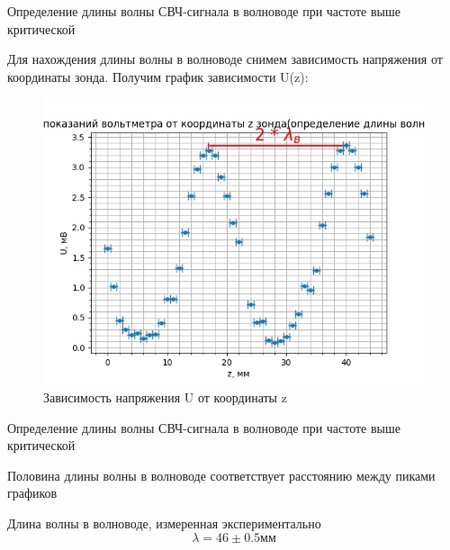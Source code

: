 \documentclass[12pt]{beamer}
\begin{document}
\begin{frame}{Определение длины волны СВЧ-сигнала в волноводе при частоте выше критической}
    \begin{block}{}
        \centering
        Для нахождения длины волны в волноводе снимем зависимость напряжения от координаты зонда. Получим график зависимости U(z):
    \end{block}
    
    \begin{figure}
        \centering
        \includegraphics[scale=0.3]{graf11.jpg}
        \caption{Зависимость напряжения U от координаты z}
        \label{fig:enter-label}
    \end{figure}
\end{frame}
\begin{frame}{Определение длины волны СВЧ-сигнала в волноводе при частоте выше критической}

    \begin{block}{}
        \centering
        Половина длины волны в волноводе соответствует расстоянию между пиками графиков
    \end{block}

    \begin{block}{Длина волны в волноводе, измеренная экспериментально}
        \centering
        \begin{equation}
            \lambda = 46 \pm 0.5 \text{мм}
        \end{equation}
    \end{block} 

\end{frame}
\end{document}
